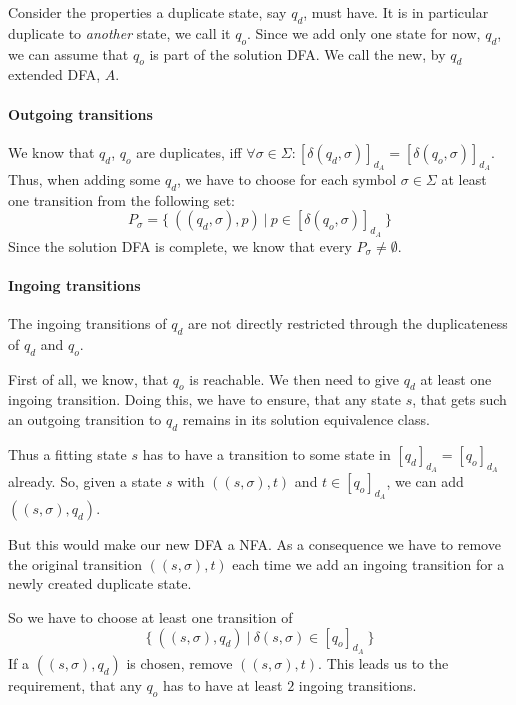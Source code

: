\documentclass[a4paper, oneside, 11pt]{report}
\theoremstyle{definition}
\theoremstyle{remark}
\newcommand{\gregorColor}{Violet}
\newcommand{\gregor}[1]{\textcolor{\gregorColor}{\textbf{Gregor:} #1}}
\begin{document}
Consider the properties a duplicate state, say $q_d$, must have. It is in particular duplicate to \emph{another} state, we call it $q_o$. Since we add only one state for now, $q_d$, we can assume that $q_o$ is part of the solution DFA. We call the new, by $q_d$ extended DFA, $A$.

\paragraph*{Outgoing transitions}

We know that $q_d$, $q_o$ are duplicates, iff $\forall \sigma \in \Sigma \colon [\delta(q_d, \sigma)]_{d_A} = [\delta(q_o, \sigma)]_{d_A}$. Thus, when adding some $q_d$, we have to choose for each symbol $\sigma \in \Sigma$ at least one transition from the following set:
\[
	P_\sigma = \{\ ((q_d, \sigma), p)\ |\ p \in [\delta(q_o, \sigma)]_{d_A}\ \}
\]
Since the solution DFA is complete, we know that every $P_\sigma \neq \emptyset$.

\paragraph*{Ingoing transitions}

The ingoing transitions of $q_d$ are not directly restricted through the duplicateness of $q_d$ and $q_o$.

First of all, we know, that $q_o$ is reachable. We then need to give $q_d$ at least one ingoing transition. Doing this, we have to ensure, that any state $s$, that gets such an outgoing transition to $q_d$ remains in its solution equivalence class.
	
Thus a fitting state $s$ has to have a transition to some state in $[q_d]_{d_A} = [q_o]_{d_A}$ already. So, given a state $s$ with $((s, \sigma), t)$ and $t \in [q_o]_{d_A}$, we can add $((s, \sigma), q_d)$.

But this would make our new DFA a NFA. As a consequence we have to remove the original transition $((s, \sigma), t)$ each time we add an ingoing transition for a newly created duplicate state.

So we have to choose at least one transition of
\[
	\{\ ((s, \sigma), q_d)\ |\ \delta(s,\sigma) \in [q_o]_{d_A}\ \}
\]
If a $((s, \sigma), q_d)$ is chosen, remove $((s, \sigma), t)$. This leads us to the requirement, that any $q_o$ has to have at least $2$ ingoing transitions.
\end{document}
